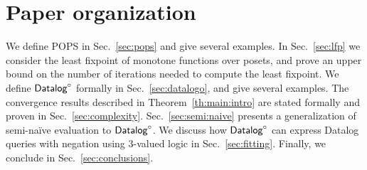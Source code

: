 \section{Paper organization}

We define POPS in Sec.~\ref{sec:pops} and give several examples.
In Sec.~\ref{sec:lfp} we consider the least fixpoint of monotone
functions over posets, and prove an upper bound on the number of
iterations needed to compute the least fixpoint.  We define $\text{\sf Datalog}^\circ$
formally in Sec.~\ref{sec:datalogo}, and give several examples.
The convergence results described in Theorem~\ref{th:main:intro} are
stated formally and proven in Sec.~\ref{sec:complexity}.
Sec.~\ref{sec:semi:naive} presents a generalization of semi-na\"ive
evaluation to $\text{\sf Datalog}^\circ$.  We discuss how $\text{\sf Datalog}^\circ$ can express Datalog
queries with negation using 3-valued logic in
Sec.~\ref{sec:fitting}.  Finally, we conclude in
Sec.~\ref{sec:conclusions}.